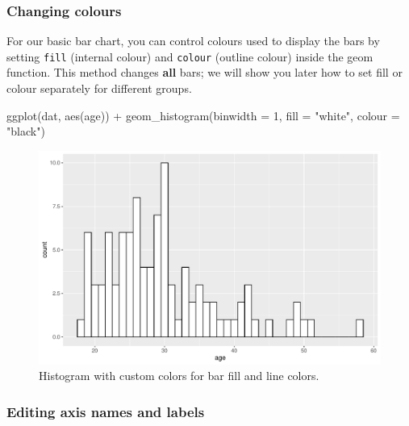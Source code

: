 \documentclass[
  english,
  doc,floatsintext]{apa6}
\newenvironment{Shaded}{\begin{snugshade}}{\end{snugshade}}
\newcommand{\AttributeTok}[1]{\textcolor[rgb]{0.77,0.63,0.00}{#1}}
\newcommand{\DecValTok}[1]{\textcolor[rgb]{0.00,0.00,0.81}{#1}}
\newcommand{\FunctionTok}[1]{\textcolor[rgb]{0.00,0.00,0.00}{#1}}
\newcommand{\NormalTok}[1]{#1}
\newcommand{\SpecialCharTok}[1]{\textcolor[rgb]{0.00,0.00,0.00}{#1}}
\newcommand{\StringTok}[1]{\textcolor[rgb]{0.31,0.60,0.02}{#1}}
\begin{document}
\hypertarget{changing-colours}{%
\subsubsection{Changing colours}\label{changing-colours}}

For our basic bar chart, you can control colours used to display the bars by setting \texttt{fill} (internal colour) and \texttt{colour} (outline colour) inside the geom function. This method changes \textbf{all} bars; we will show you later how to set fill or colour separately for different groups.

\begin{Shaded}
\begin{Highlighting}[]
\FunctionTok{ggplot}\NormalTok{(dat, }\FunctionTok{aes}\NormalTok{(age)) }\SpecialCharTok{+}
  \FunctionTok{geom\_histogram}\NormalTok{(}\AttributeTok{binwidth =} \DecValTok{1}\NormalTok{, }
                 \AttributeTok{fill =} \StringTok{"white"}\NormalTok{, }
                 \AttributeTok{colour =} \StringTok{"black"}\NormalTok{)}
\end{Highlighting}
\end{Shaded}

\begin{figure}

{\centering \includegraphics[width=1\linewidth]{images/histogram-fill-color-1} 

}

\caption{Histogram with custom colors for bar fill and line colors.}\label{fig:histogram-fill-color}
\end{figure}

\hypertarget{editing-axis-names-and-labels}{%
\subsubsection{Editing axis names and labels}\label{editing-axis-names-and-labels}}
\end{document}

